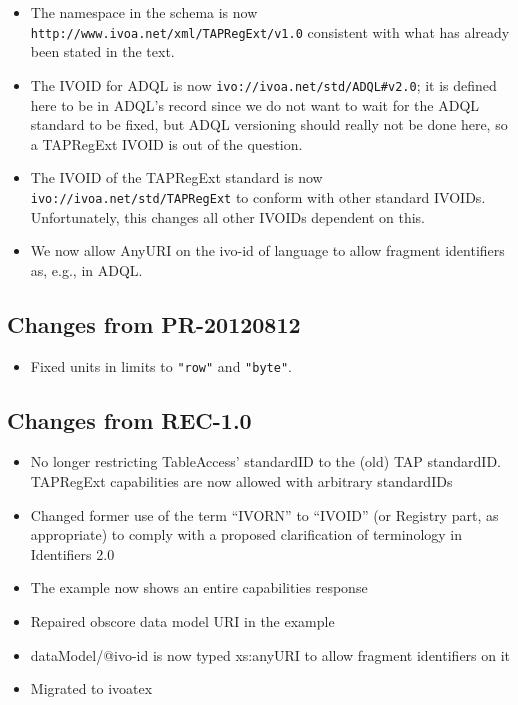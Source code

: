 \documentclass{ivoa}
\begin{document}
\label{changes-20110727}

\begin{itemize}

\item The namespace in the schema is now \nolinkurl{http://www.ivoa.net/xml/TAPRegExt/v1.0} consistent with what has already been stated in the text.{}

\item The IVOID for ADQL is now
\nolinkurl{ivo://ivoa.net/std/ADQL\#v2.0}; it is defined here to be in
ADQL's record since we do not want to wait for the ADQL standard to be
fixed, but ADQL versioning should really not be done here, so a
TAPRegExt IVOID is out of the question.{}

\item The IVOID of the TAPRegExt standard is now
\texttt{ivo://ivoa.net/std/TAPRegExt} to conform with other standard
IVOIDs.  Unfortunately, this changes
all other IVOIDs dependent on this.{}

\item We now allow AnyURI on the ivo-id of language to allow fragment identifiers as, e.g., in ADQL.{}

\end{itemize}


\subsection{Changes from PR-20120812}

\label{changes-20120208}

\begin{itemize}

\item Fixed units in limits to \verb|"row"| and \verb|"byte"|.

\end{itemize}

\subsection{Changes from REC-1.0}

\label{changes-rec-1.0}

\begin{itemize}

\item No longer restricting TableAccess' standardID to the (old)
TAP standardID.  TAPRegExt capabilities are now allowed with arbitrary
standardIDs
\item Changed former use of the term ``IVORN''  to ``IVOID'' (or
Registry part, as appropriate) to comply with a proposed clarification of 
terminology in Identifiers 2.0
\item The example now shows an entire capabilities response
\item Repaired obscore data model URI in the example
\item dataModel/@ivo-id is now typed xs:anyURI
to allow fragment identifiers on it
\item Migrated to ivoatex
\end{itemize}


\end{document}
